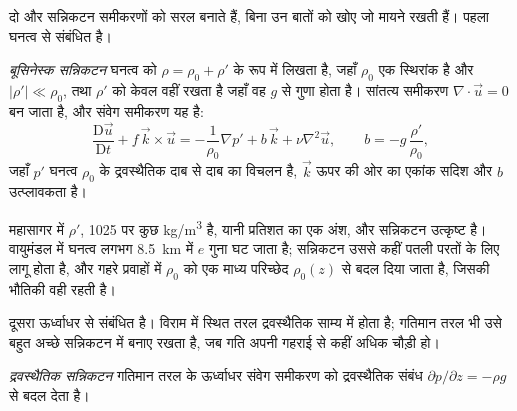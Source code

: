 \begin{omfigure}
\par{}\label{fig:b3:gfd-foundations:frame}
\end{omfigure}

दो और सन्निकटन समीकरणों को सरल बनाते हैं, बिना उन बातों को खोए
जो मायने रखती हैं। पहला घनत्व से संबंधित है।

\begin{definition}[बूसिनेस्क सन्निकटन]\label{def:b3:gfd-foundations:boussinesq}
\emph{बूसिनेस्क सन्निकटन} घनत्व को
$\rho = \rho_0 + \rho'$ के रूप में लिखता है, जहाँ $\rho_0$ एक स्थिरांक है और
$|\rho'| \ll \rho_0$, तथा $\rho'$ को केवल वहीं रखता है जहाँ वह $g$ से गुणा होता है।
सांतत्य समीकरण $\nabla\cdot\vec u = 0$ बन जाता है, और संवेग
समीकरण यह है:
\[
\frac{\mathrm D\vec u}{\mathrm Dt} + f\,\vec k\times\vec u =
-\frac{1}{\rho_0}\nabla p' + b\,\vec k + \nu\nabla^2\vec u ,
\qquad b = -g\,\frac{\rho'}{\rho_0} ,
\]
जहाँ $p'$ घनत्व $\rho_0$ के द्रवस्थैतिक दाब से
दाब का विचलन है, $\vec k$ ऊपर की ओर का एकांक सदिश और
$b$ उत्प्लावकता है।
\end{definition}

महासागर में $\rho'$, \num{1025} पर कुछ \unit{kg/m^3} है, यानी प्रतिशत का
एक अंश, और सन्निकटन उत्कृष्ट है। वायुमंडल में घनत्व
लगभग \qty{8.5}{km} में $e$ गुना घट जाता है; सन्निकटन उससे कहीं पतली
परतों के लिए लागू होता है, और गहरे प्रवाहों में $\rho_0$ को एक
माध्य परिच्छेद $\rho_0(z)$ से बदल दिया जाता है, जिसकी भौतिकी वही रहती है।

दूसरा ऊर्ध्वाधर से संबंधित है। विराम में स्थित तरल द्रवस्थैतिक
साम्य में होता है; गतिमान तरल भी उसे बहुत अच्छे सन्निकटन में बनाए रखता है, जब
गति अपनी गहराई से कहीं अधिक चौड़ी हो।

\begin{definition}\label{def:b3:gfd-foundations:hydrostatic}
\emph{द्रवस्थैतिक सन्निकटन}
गतिमान तरल के ऊर्ध्वाधर संवेग समीकरण को
द्रवस्थैतिक संबंध $\partial p/\partial z = -\rho g$ से बदल देता है।
\end{definition}

